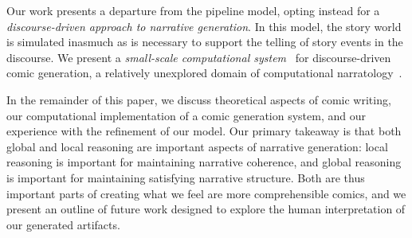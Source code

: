 Our work presents a departure from the pipeline model, opting instead for a
\emph{discourse-driven approach to narrative generation}. In this model, the
story world is simulated inasmuch as is necessary to support the telling of
story events in the discourse. We present a \emph{small-scale computational
system}~\cite{montfort2012small} for discourse-driven comic generation, a
relatively unexplored domain of computational narratology~\cite{mani2012computational}.

In the remainder of this paper, we discuss theoretical aspects of comic
writing, our computational implementation of a comic generation system, and
our experience with the refinement of our model. Our primary takeaway is
that both global and local reasoning are important aspects of
narrative generation: local reasoning is important for maintaining
narrative coherence, and global reasoning is important for
maintaining satisfying narrative structure. Both are thus important parts
of creating what we feel are more comprehensible comics, and we present an
outline of future work designed to explore the human interpretation of our
generated artifacts.



